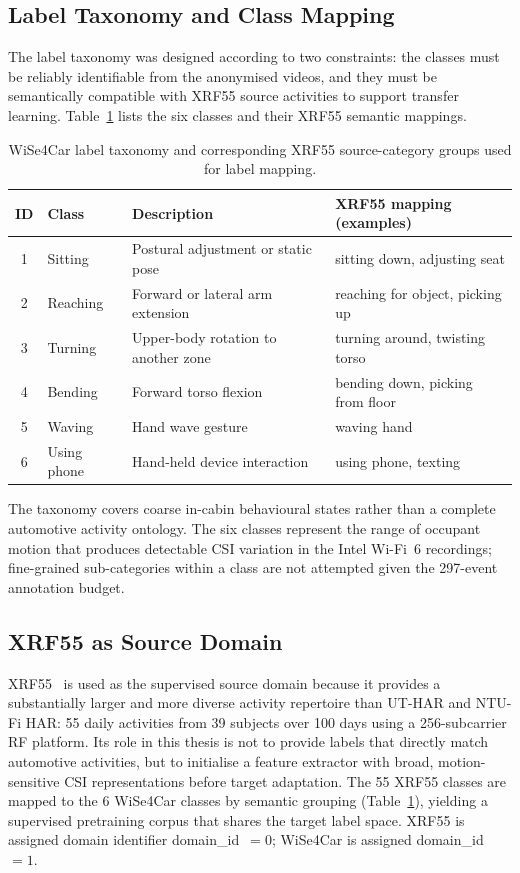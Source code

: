 \documentclass[english,bibtex]{kththesis}
\begin{document}
\subsection{Label Taxonomy and Class Mapping}
\label{sec:taxonomy}

The label taxonomy was designed according to two constraints: the classes must be reliably identifiable from the anonymised videos, and they must be semantically compatible with XRF55 source activities to support transfer learning. Table~\ref{tab:taxonomy} lists the six classes and their XRF55 semantic mappings.

\begin{table}[!ht]
\caption{WiSe4Car label taxonomy and corresponding XRF55 source-category groups used for label mapping.}
\label{tab:taxonomy}
\centering
\small
\begin{tabular}{cllp{5cm}}
\toprule
\textbf{ID} & \textbf{Class} & \textbf{Description} & \textbf{XRF55 mapping (examples)} \\
\midrule
1 & Sitting     & Postural adjustment or static pose   & sitting down, adjusting seat \\
2 & Reaching    & Forward or lateral arm extension     & reaching for object, picking up \\
3 & Turning     & Upper-body rotation to another zone  & turning around, twisting torso \\
4 & Bending     & Forward torso flexion                & bending down, picking from floor \\
5 & Waving      & Hand wave gesture                    & waving hand \\
6 & Using phone & Hand-held device interaction         & using phone, texting \\
\bottomrule
\end{tabular}
\end{table}

The taxonomy covers coarse in-cabin behavioural states rather than a complete automotive activity ontology. The six classes represent the range of occupant motion that produces detectable CSI variation in the Intel Wi-Fi~6 recordings; fine-grained sub-categories within a class are not attempted given the 297-event annotation budget.

\subsection{XRF55 as Source Domain}
\label{sec:xrf55source}

XRF55~\cite{wang2024xrf55} is used as the supervised source domain because it provides a substantially larger and more diverse activity repertoire than UT-HAR and NTU-Fi HAR: 55 daily activities from 39 subjects over 100 days using a 256-subcarrier RF platform. Its role in this thesis is not to provide labels that directly match automotive activities, but to initialise a feature extractor with broad, motion-sensitive CSI representations before target adaptation. The 55 XRF55 classes are mapped to the 6 WiSe4Car classes by semantic grouping (Table~\ref{tab:taxonomy}), yielding a supervised pretraining corpus that shares the target label space. XRF55 is assigned domain identifier domain\_id~$=0$; WiSe4Car is assigned domain\_id~$=1$.
\end{document}
